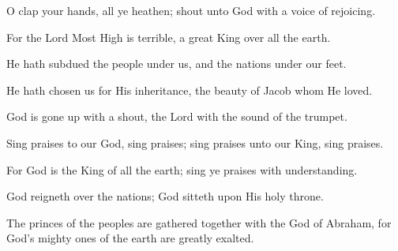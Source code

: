 O clap your hands, all ye heathen; shout unto God with a voice of rejoicing.

For the Lord Most High is terrible, a great King over all the earth.

He hath subdued the people under us, and the nations under our feet.

He hath chosen us for His inheritance, the beauty of Jacob whom He loved.

God is gone up with a shout, the Lord with the sound of the trumpet.

Sing praises to our God, sing praises; sing praises unto our King, sing praises.

For God is the King of all the earth; sing ye praises with understanding.

God reigneth over the nations; God sitteth upon His holy throne.

The princes of the peoples are gathered together with the God of Abraham, for God's mighty ones of the earth are greatly exalted.
